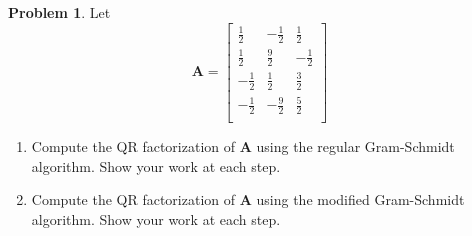 \documentclass[12pt]{article}
\theoremstyle{definition}
\newtheorem{problem}{Problem}
\renewcommand{\vec}{\mathbf}
\begin{document}
\clearpage
\begin{problem}
    Let \[
        \vec{A} = 
        \begin{bmatrix}
        \frac{1}{2} & -\frac{1}{2} & \frac{1}{2} \\
        \frac{1}{2} & \frac{9}{2} & -\frac{1}{2} \\
        -\frac{1}{2} & \frac{1}{2} & \frac{3}{2} \\
        -\frac{1}{2} & -\frac{9}{2} & \frac{5}{2} \\
        \end{bmatrix}
    \]
    \begin{enumerate}
        \item Compute the QR factorization of $\vec{A}$ using the regular Gram-Schmidt algorithm.
        Show your work at each step.
        \item Compute the QR factorization of $\vec{A}$ using the modified Gram-Schmidt algorithm.
        Show your work at each step.
    \end{enumerate}
\end{problem}
\end{document}
